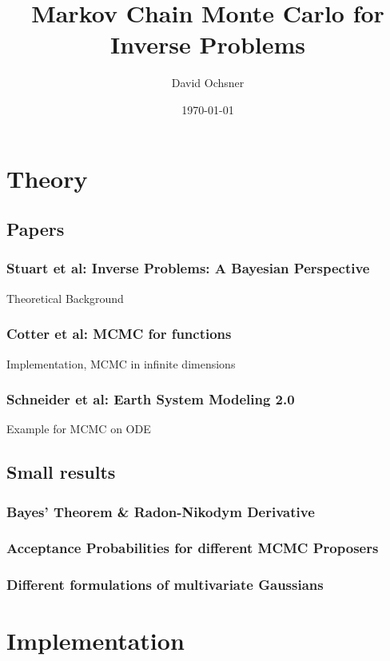\documentclass[11pt]{article}
\author{David Ochsner}
\date{\today}
\title{Markov Chain Monte Carlo for Inverse Problems}
\begin{document}
\maketitle
\tableofcontents


\section{Theory}
\label{sec:org8cba167}
\subsection{Papers}
\label{sec:org91168a8}
\subsubsection{Stuart et al: Inverse Problems: A Bayesian Perspective \cite{stuart_inverse_2010}}
\label{sec:org0db9e4f}
Theoretical Background
\subsubsection{Cotter et al: MCMC for functions \cite{cotter_mcmc_2013}}
\label{sec:org3d4e875}
Implementation, MCMC in infinite dimensions
\subsubsection{Schneider et al: Earth System Modeling 2.0  \cite{schneider_earth_2017}}
\label{sec:org11ad06f}
Example for MCMC on ODE
\subsection{Small results}
\label{sec:orge2e3c93}
\subsubsection{Bayes' Theorem \& Radon-Nikodym Derivative}
\label{sec:orgd3a9d34}
\subsubsection{Acceptance Probabilities for different MCMC Proposers}
\label{sec:org3df3b26}
\subsubsection{Different formulations of multivariate Gaussians}
\label{sec:org3bdfb72}

\section{Implementation}
\label{sec:org68a0038}
\end{document}
